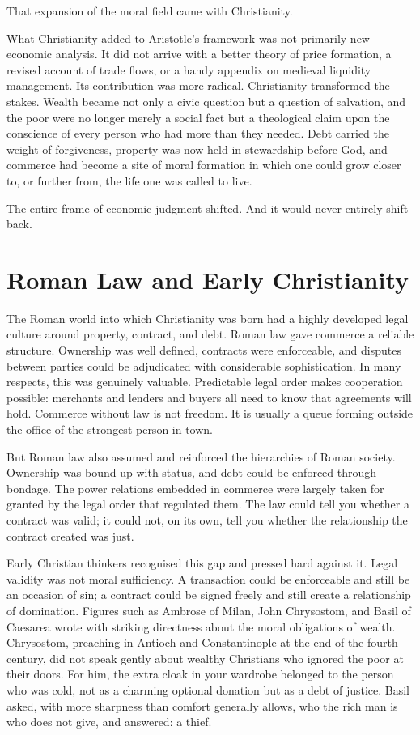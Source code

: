 \documentclass[11pt,a4paper,oneside]{book}
\begin{document}
That expansion of the moral field came with Christianity.

What Christianity added to Aristotle's framework was not primarily new economic analysis. It did not arrive with a better theory of price formation, a revised account of trade flows, or a handy appendix on medieval liquidity management. Its contribution was more radical. Christianity transformed the stakes. Wealth became not only a civic question but a question of salvation, and the poor were no longer merely a social fact but a theological claim upon the conscience of every person who had more than they needed. Debt carried the weight of forgiveness, property was now held in stewardship before God, and commerce had become a site of moral formation in which one could grow closer to, or further from, the life one was called to live.

The entire frame of economic judgment shifted. And it would never entirely shift back.

\section*{Roman Law and Early Christianity}

The Roman world into which Christianity was born had a highly developed legal culture around property, contract, and debt. Roman law gave commerce a reliable structure. Ownership was well defined, contracts were enforceable, and disputes between parties could be adjudicated with considerable sophistication. In many respects, this was genuinely valuable. Predictable legal order makes cooperation possible: merchants and lenders and buyers all need to know that agreements will hold. Commerce without law is not freedom. It is usually a queue forming outside the office of the strongest person in town.

But Roman law also assumed and reinforced the hierarchies of Roman society. Ownership was bound up with status, and debt could be enforced through bondage. The power relations embedded in commerce were largely taken for granted by the legal order that regulated them. The law could tell you whether a contract was valid; it could not, on its own, tell you whether the relationship the contract created was just.

Early Christian thinkers recognised this gap and pressed hard against it. Legal validity was not moral sufficiency. A transaction could be enforceable and still be an occasion of sin; a contract could be signed freely and still create a relationship of domination. Figures such as Ambrose of Milan, John Chrysostom, and Basil of Caesarea wrote with striking directness about the moral obligations of wealth. Chrysostom, preaching in Antioch and Constantinople at the end of the fourth century, did not speak gently about wealthy Christians who ignored the poor at their doors. For him, the extra cloak in your wardrobe belonged to the person who was cold, not as a charming optional donation but as a debt of justice. Basil asked, with more sharpness than comfort generally allows, who the rich man is who does not give, and answered: a thief.
\end{document}
